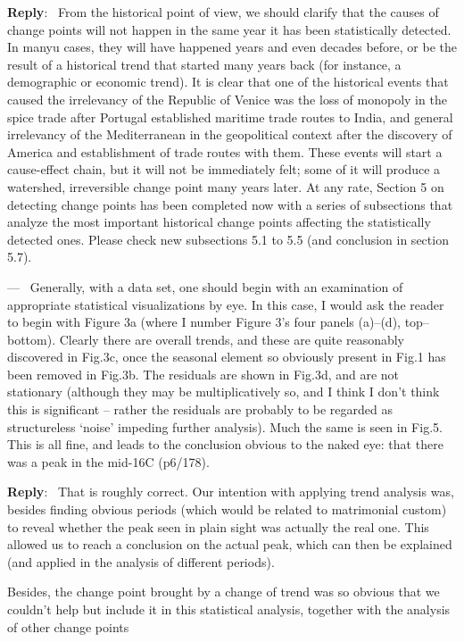 \documentclass[11pt]{article}
\newcounter{reviewer}
\newcounter{point}[reviewer]
\renewcommand{\thepoint}{P\,\thereviewer.\arabic{point}}
\newenvironment{point}
   {\refstepcounter{point} \bigskip \noindent {\textbf{Reviewer~Point~\thepoint} } ---\ }
   {\par }
\newenvironment{reply}
   {\medskip \noindent \begin{sf}\textbf{Reply}:\  }
   {\medskip \end{sf}}
\begin{document}
\begin{reply}
From the historical point of view, we should clarify that the causes of change
points will not happen in the same year it has been statistically detected. In
manyu cases, they will have happened years and even decades before, or be the
result of a historical trend that started many years back (for instance, a
demographic or economic trend). It is clear that one of the historical events
that caused the irrelevancy of the Republic of Venice was the loss of monopoly
in the spice trade after Portugal established maritime trade routes to India,
and general irrelevancy of the Mediterranean in the geopolitical context after
the discovery of America and establishment of trade routes with them. These
events will start a cause-effect chain, but it will not be immediately felt;
some of it will produce a watershed, irreversible change point many years
later. At any rate, Section 5 on detecting change points has been completed now
with a series of subsections that analyze the most important historical change
points affecting the statistically detected ones. Please check new subsections
5.1 to 5.5 (and conclusion in section 5.7).
\end{reply}

\begin{point}
Generally, with a data set, one should begin with an examination of appropriate statistical visualizations by eye. In this case, I would ask the reader
to begin with Figure 3a (where I number Figure 3’s four panels (a)–(d), top–
bottom). Clearly there are overall trends, and these are quite reasonably
discovered in Fig.3c, once the seasonal element so obviously present in Fig.1
has been removed in Fig.3b. The residuals are shown in Fig.3d, and are not
stationary (although they may be multiplicatively so, and I think I don’t
think this is significant – rather the residuals are probably to be regarded
as structureless ‘noise’ impeding further analysis). Much the same is seen
in Fig.5. This is all fine, and leads to the conclusion obvious to the naked
eye: that there was a peak in the mid-16C (p6/178).
\end{point}

\begin{reply}
  That is roughly correct. Our intention with applying trend analysis was,
  besides finding obvious periods (which would be related to matrimonial custom)
  to reveal whether the peak seen in plain sight was actually the real one. This
  allowed us to reach a conclusion on the actual peak, which can then be
  explained (and applied in the analysis of different periods).

  Besides, the change point brought by a change of trend was so obvious that we
  couldn't help but include it in this statistical analysis, together with the
  analysis of other change points
\end{reply}  
\end{document}
